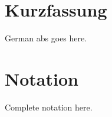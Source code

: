 \documentclass[oneside]{scrbook}
\theoremstyle{definition}
\theoremstyle{definition}
\theoremstyle{remark}
\begin{document}
% 
%                                                               
%                                                               
%                                                               
% 
\chapter{Kurzfassung}
German abs goes here.

% 
%                                                                                         
%                                                                                         
%                                                                                         
% 
\chapter{Notation}
Complete notation here.

% 
%                                              
%                                              
%                                              
% 
\mainmatter






\end{document}
